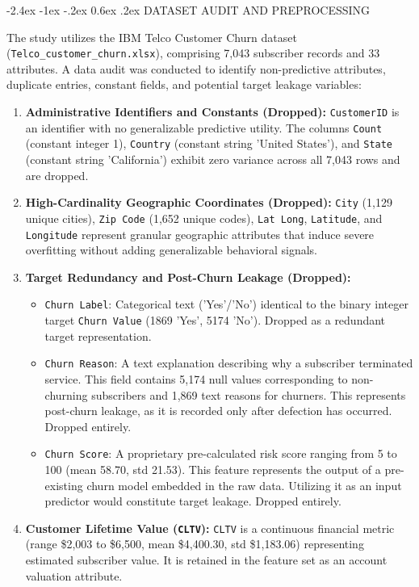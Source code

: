 \documentclass[12pt,oneside]{report}
\makeatletter
\renewcommand{\section}{\@startsection{section}{1}{\z@}%
  {-2.4ex \@plus -1ex \@minus -.2ex}%
  {0.6ex \@plus .2ex}%
  {\normalfont\large\bfseries}}
\makeatother
\begin{document}
\newpage
\section{DATASET AUDIT AND PREPROCESSING}

The study utilizes the IBM Telco Customer Churn dataset (\texttt{Telco\_customer\_churn.xlsx}), comprising 7,043 subscriber records and 33 attributes. A data audit was conducted to identify non-predictive attributes, duplicate entries, constant fields, and potential target leakage variables:
\begin{enumerate}
    \item \textbf{Administrative Identifiers and Constants (Dropped):} \texttt{CustomerID} is an identifier with no generalizable predictive utility. The columns \texttt{Count} (constant integer 1), \texttt{Country} (constant string 'United States'), and \texttt{State} (constant string 'California') exhibit zero variance across all 7,043 rows and are dropped.
    \item \textbf{High-Cardinality Geographic Coordinates (Dropped):} \texttt{City} (1,129 unique cities), \texttt{Zip Code} (1,652 unique codes), \texttt{Lat Long}, \texttt{Latitude}, and \texttt{Longitude} represent granular geographic attributes that induce severe overfitting without adding generalizable behavioral signals.
    \item \textbf{Target Redundancy and Post-Churn Leakage (Dropped):}
    \begin{itemize}
        \item \texttt{Churn Label}: Categorical text ('Yes'/'No') identical to the binary integer target \texttt{Churn Value} (1869 'Yes', 5174 'No'). Dropped as a redundant target representation.
        \item \texttt{Churn Reason}: A text explanation describing why a subscriber terminated service. This field contains 5,174 null values corresponding to non-churning subscribers and 1,869 text reasons for churners. This represents post-churn leakage, as it is recorded only after defection has occurred. Dropped entirely.
        \item \texttt{Churn Score}: A proprietary pre-calculated risk score ranging from 5 to 100 (mean 58.70, std 21.53). This feature represents the output of a pre-existing churn model embedded in the raw data. Utilizing it as an input predictor would constitute target leakage. Dropped entirely.
    \end{itemize}
    \item \textbf{Customer Lifetime Value (\texttt{CLTV}):} \texttt{CLTV} is a continuous financial metric (range \$2,003 to \$6,500, mean \$4,400.30, std \$1,183.06) representing estimated subscriber value. It is retained in the feature set as an account valuation attribute.
\end{enumerate}
\end{document}
